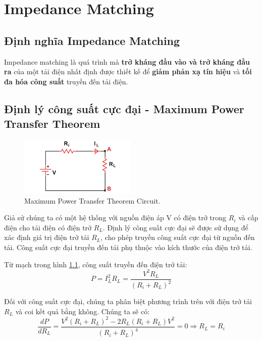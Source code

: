 \chapter{Impedance Matching}
    \section{Định nghĩa Impedance Matching}
        Impedance matching là quá trình mà \textbf{trở kháng đầu vào và trở kháng đầu ra} 
        của một tải điện nhất định được thiết kế để \textbf{giảm phản xạ tín hiệu} và 
        \textbf{tối đa hóa công suất} truyền đến tải điện.\cite{allaboutcircuits_impedance}
    
    \section{Định lý công suất cực đại - Maximum Power Transfer Theorem}
        \begin{figure}[h]
            \centering
            \includegraphics[width=0.5\textwidth]{figures/max_power_transfer_circuit.png}
            \caption{Maximum Power Transfer Theorem Circuit.}
            \label{fig:max_power_transfer_circuit}
        \end{figure}

        Giả sử chúng ta có một hệ thống với nguồn điện áp V có điện trở trong $R_i$ và cấp điện cho tải điện có điện trở $R_L$. 
        Định lý công suất cực đại sẽ được sử dụng để xác định giá trị điện trở tải $R_L$, 
        cho phép truyền công suất cực đại từ nguồn đến tải. 
        Công suất cực đại truyền đến tải phụ thuộc vào kích thước của điện trở tải.\par

        Từ mạch trong hình \ref{fig:max_power_transfer_circuit}, công suất truyền đến điện trở tải:
        \begin{equation}
            P = I_L^2 R_L = \frac{V^2 R_L}{(R_i + R_L)^2}
        \end{equation}

        Đối với công suất cực đại, chúng ta phân biệt phương trình trên với điện trở tải $R_L$ và coi kết quả bằng không. 
        Chúng ta sẽ có:
        \begin{equation}
            \frac{dP}{dR_L} = \frac{V^2 (R_i + R_L)^2 - 2R_L (R_i + R_L) V^2}{(R_i + R_L)^4} = 0 \Rightarrow R_L = R_i
        \end{equation}

